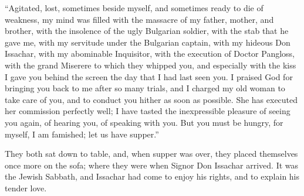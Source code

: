 ``Agitated, lost, sometimes beside myself, and sometimes ready to die of weakness, my mind was filled with the massacre of my father, mother, and brother, with the insolence of the ugly Bulgarian soldier, with the stab that he gave me, with my servitude under the Bulgarian captain, with my hideous Don Issachar, with my abominable Inquisitor, with the execution of Doctor Pangloss, with the grand Miserere to which they whipped you, and especially with the kiss I gave you behind the screen the day that I had last seen you. I praised God for bringing you back to me after so many trials, and I charged my old woman to take care of you, and to conduct you hither as soon as possible. She has executed her commission perfectly well; I have tasted the inexpressible pleasure of seeing you again, of hearing you, of speaking with you. But you must be hungry, for myself, I am famished; let us have supper.''

They both sat down to table, and, when supper was over, they placed themselves once more on the sofa; where they were when Signor Don Issachar arrived. It was the Jewish Sabbath, and Issachar had come to enjoy his rights, and to explain his tender love.

